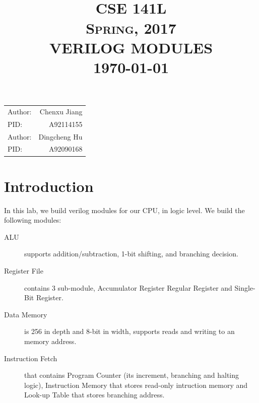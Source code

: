 \documentclass{article}
\title{\quad
  \\ [4.0cm]
  \normalsize \textsc{CSE 141L \\ Spring, 2017}
  \\ [2.0cm]
  \huge \textbf{\uppercase{Verilog Modules}}
  \\ [0.5cm]
  \normalsize \today}
\author{}
\date{}
\begin{document}
  \maketitle
  \vspace{6.0cm}
  \begin{large}
    \begin{center}
      \begin{tabular}{l r}
        Author:        & Chenxu Jiang \\
        PID:            & A92114155 \\
        Author:        & Dingcheng Hu \\
        PID:            & A92090168
      \end{tabular}
    \end{center}
  \end{large}
  \newpage
  \section{Introduction}
    In this lab, we build verilog modules for our CPU, in logic level.
    We build the following modules:
    \begin{description}
      \item[ALU] supports addition/subtraction, 1-bit shifting, and branching
        decision.
      \item[Register File] contains 3 sub-module, Accumulator Register
        Regular Register and Single-Bit Register.
      \item[Data Memory] is 256 in depth and 8-bit in width, supports
        reads and writing to an memory address.
      \item[Instruction Fetch] that contains Program Counter (its increment,
        branching and halting logic), Instruction Memory that stores read-only
        intruction memory and Look-up Table that stores branching address.
    \end{description}
\end{document}
